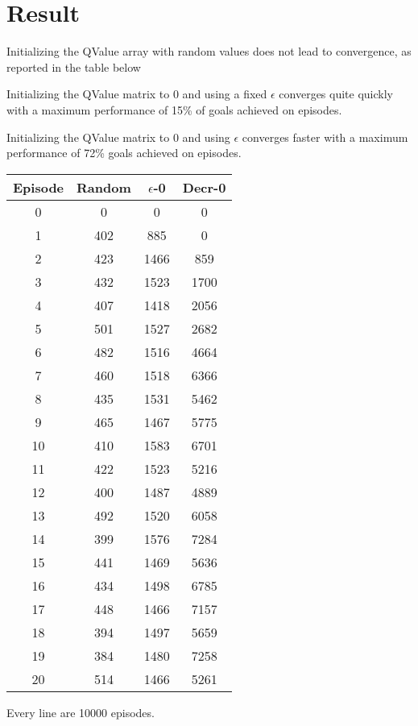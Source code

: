 \documentclass{article}
\begin{document}
\section{Result}

Initializing the QValue array with random values does not lead to convergence, as reported in the table below

Initializing the QValue matrix to 0 and using a fixed $\epsilon$ converges quite quickly with a maximum performance of 15\% of goals achieved on episodes.

Initializing the QValue matrix to 0 and using $\epsilon$ converges faster with a maximum performance of 72\% goals achieved on episodes.

\begin{center}
\begin{tabular}{||c c c c||}
\hline
 Episode & Random & $\epsilon$-0 & Decr-0 \\ [0.5ex] 
\hline\hline
0 &   0 &   0 &   0 \\
1 &   402 &   885 &   0 \\
2 &   423 &   1466 &   859 \\
3 &   432 &   1523 &   1700 \\
4 &   407 &   1418 &   2056 \\
5 &   501 &   1527 &   2682 \\
6 &   482 &   1516 &   4664 \\
7 &   460 &   1518 &   6366 \\
8 &   435 &   1531 &   5462 \\
9 &   465 &   1467 &   5775 \\
10 &   410 &   1583 &   6701 \\
11 &   422 &   1523 &   5216 \\
12 &   400 &   1487 &   4889 \\
13 &   492 &   1520 &   6058 \\
14 &   399 &   1576 &   7284 \\
15 &   441 &   1469 &   5636 \\
16 &   434 &   1498 &   6785 \\
17 &   448 &   1466 &   7157 \\
18 &   394 &   1497 &   5659 \\
19 &   384 &   1480 &   7258 \\
20 &   514 &   1466 &   5261 \\
\hline\hline
\end{tabular}
\end{center}


Every line are 10000 episodes.
\end{document}
